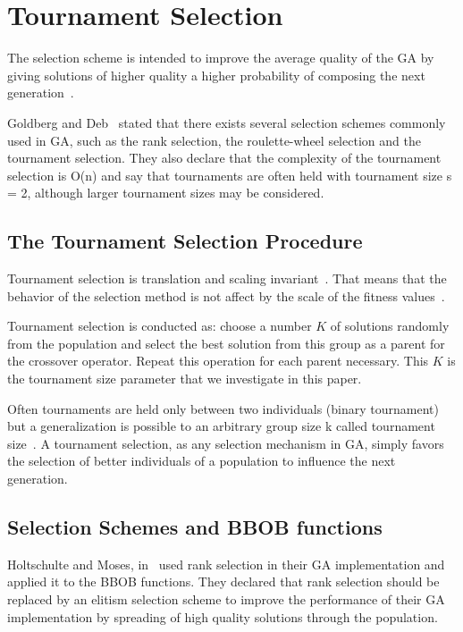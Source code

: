 \section{Tournament Selection}\label{sec:background:Selection Scheme} 

The selection scheme is intended to improve the average quality of the GA by giving solutions of higher quality a higher probability of composing the next generation~\cite{blickle1995mathematical}.

Goldberg and Deb~\cite{goldberg1991comparative} stated that there exists several selection schemes commonly used in GA, such as the rank selection, the roulette-wheel selection and the tournament selection. They also declare that the complexity of the tournament selection is O(n) and say that tournaments are often held with tournament size s = 2, although larger tournament sizes may be considered.

\subsection{The Tournament Selection Procedure}\label{sec:background:tournament_selection} 

Tournament selection is translation and scaling invariant~\cite{maza1993analysis}. That means that the behavior of the selection method is not affect by the scale of the fitness values~\cite{back2000evolutionary}.

Tournament selection is conducted as: choose a number $K$ of solutions randomly from the population and select the best solution from this group as a parent for the crossover operator. Repeat this operation for each parent necessary. This $K$ is the tournament size parameter that we investigate in this paper.

Often tournaments are held only between two individuals (binary tournament) but a generalization is possible to an arbitrary group size k called tournament size~\cite{blickle1995mathematical, goldberg1991comparative}. A tournament selection, as any selection mechanism in GA, simply favors the selection of better individuals of a population to influence the next generation. 


\subsection{Selection Schemes and BBOB functions}


Holtschulte and Moses, in~\cite{holtschulte2013benchmarking} used rank selection in their GA implementation and applied it to the BBOB functions. They declared that rank selection should be replaced by an elitism selection scheme to improve the performance of their GA implementation by spreading of high quality solutions through the population. 

